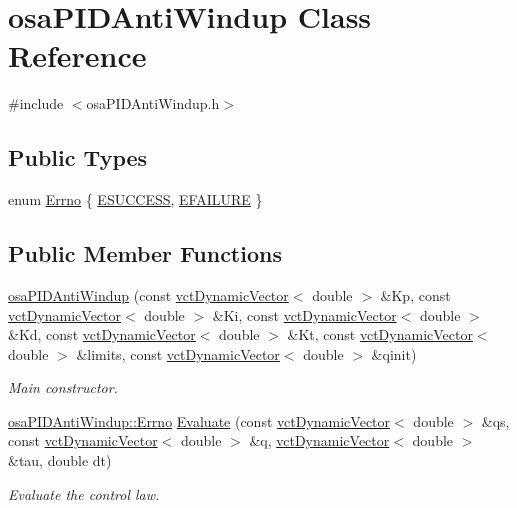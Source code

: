 \hypertarget{classosa_p_i_d_anti_windup}{}\section{osa\+P\+I\+D\+Anti\+Windup Class Reference}
\label{classosa_p_i_d_anti_windup}


{\ttfamily \#include $<$osa\+P\+I\+D\+Anti\+Windup.\+h$>$}

\subsection*{Public Types}
\begin{DoxyCompactItemize}
\item 
enum \hyperlink{classosa_p_i_d_anti_windup_ab655b152550fb621ee6d522bd793b310}{Errno} \{ \hyperlink{classosa_p_i_d_anti_windup_ab655b152550fb621ee6d522bd793b310aca75d02e8908f3345bfad5bbe8678523}{E\+S\+U\+C\+C\+E\+S\+S}, 
\hyperlink{classosa_p_i_d_anti_windup_ab655b152550fb621ee6d522bd793b310a0ab9e5fcfd01e987bef306b47ff2a8a3}{E\+F\+A\+I\+L\+U\+R\+E}
 \}
\end{DoxyCompactItemize}
\subsection*{Public Member Functions}
\begin{DoxyCompactItemize}
\item 
\hyperlink{classosa_p_i_d_anti_windup_a0ffc08fd3a706fdab6f3eb65fe8af038}{osa\+P\+I\+D\+Anti\+Windup} (const \hyperlink{classvct_dynamic_vector}{vct\+Dynamic\+Vector}$<$ double $>$ \&Kp, const \hyperlink{classvct_dynamic_vector}{vct\+Dynamic\+Vector}$<$ double $>$ \&Ki, const \hyperlink{classvct_dynamic_vector}{vct\+Dynamic\+Vector}$<$ double $>$ \&Kd, const \hyperlink{classvct_dynamic_vector}{vct\+Dynamic\+Vector}$<$ double $>$ \&Kt, const \hyperlink{classvct_dynamic_vector}{vct\+Dynamic\+Vector}$<$ double $>$ \&limits, const \hyperlink{classvct_dynamic_vector}{vct\+Dynamic\+Vector}$<$ double $>$ \&qinit)
\begin{DoxyCompactList}\small\item\em Main constructor. \end{DoxyCompactList}\item 
\hyperlink{classosa_p_i_d_anti_windup_ab655b152550fb621ee6d522bd793b310}{osa\+P\+I\+D\+Anti\+Windup\+::\+Errno} \hyperlink{classosa_p_i_d_anti_windup_a8c370639ecde55fdea4c29eb1b345c22}{Evaluate} (const \hyperlink{classvct_dynamic_vector}{vct\+Dynamic\+Vector}$<$ double $>$ \&qs, const \hyperlink{classvct_dynamic_vector}{vct\+Dynamic\+Vector}$<$ double $>$ \&q, \hyperlink{classvct_dynamic_vector}{vct\+Dynamic\+Vector}$<$ double $>$ \&tau, double dt)
\begin{DoxyCompactList}\small\item\em Evaluate the control law. \end{DoxyCompactList}\end{DoxyCompactItemize}


